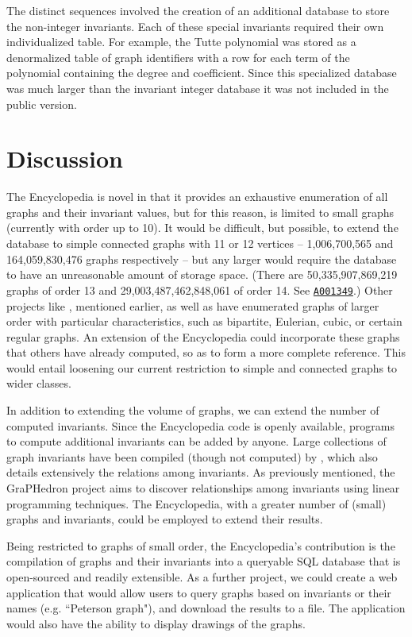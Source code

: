 \documentclass[12pt]{article}
\newcommand{\note}[1]{\todo[inline]{#1}}
\newcommand{\OEIS}[1]
{\href{https://oeis.org/#1}{\texttt{#1}}}
\begin{document}
The distinct sequences involved the creation of an additional database to store the non-integer invariants. 
Each of these special invariants required their own individualized table.
For example, the Tutte polynomial was stored as a denormalized table of graph identifiers with a row for each term of the polynomial containing the degree and coefficient.
Since this specialized database was much larger than the invariant integer database it was not included in the public version.

\note{list some interesting relations}

\section{Discussion}
The Encyclopedia is novel in that it provides an exhaustive enumeration of all graphs and their invariant values, but for this reason, is limited to small graphs (currently with order up to 10). 
It would be difficult, but possible, to extend the database to simple connected graphs with 11 or 12 vertices -- 1,006,700,565 and 164,059,830,476 graphs respectively -- but any larger would require the database to have an unreasonable amount of storage space. 
(There are 50,335,907,869,219 graphs of order 13 and 29,003,487,462,848,061 of order 14. See \OEIS{A001349}.) 
Other projects like \cite{mckay2014combinatorial,royle2014small}, mentioned earlier, as well as \cite{meringer2014regular} have enumerated graphs of larger order with particular characteristics, such as bipartite, Eulerian, cubic, or certain regular graphs. 
An extension of the Encyclopedia could incorporate these graphs that others have already computed, so as to form a more complete reference. 
This would entail loosening our current restriction to simple and connected graphs to wider classes. 

In addition to extending the volume of graphs, we can extend the number of computed invariants. 
Since the Encyclopedia code is openly available, programs to compute additional invariants can be added by anyone. 
Large collections of graph invariants have been compiled (though not computed) by \cite{gccat}, which also details extensively the relations among invariants. 
As previously mentioned, the GraPHedron project aims to discover relationships among invariants using linear programming techniques. 
The Encyclopedia, with a greater number of (small) graphs and invariants, could be employed to extend their results. 

Being restricted to graphs of small order, the Encyclopedia's contribution is the compilation of graphs and their invariants into a queryable SQL database that is open-sourced and readily extensible. 
As a further project, we could create a web application that would allow users to query graphs based on invariants or their names (e.g. ``Peterson graph"), and download the results to a file. 
The application would also have the ability to display drawings of the graphs. 
\end{document}
